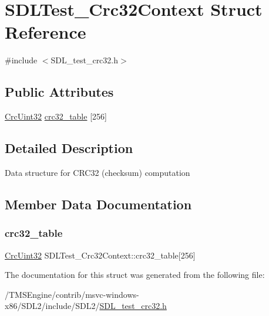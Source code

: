 \hypertarget{struct_s_d_l_test___crc32_context}{}\section{S\+D\+L\+Test\+\_\+\+Crc32\+Context Struct Reference}
\label{struct_s_d_l_test___crc32_context}


{\ttfamily \#include $<$S\+D\+L\+\_\+test\+\_\+crc32.\+h$>$}

\subsection*{Public Attributes}
\begin{DoxyCompactItemize}
\item 
\hyperlink{_s_d_l__test__crc32_8h_ac0e8fe38fa91e9aa4b32957420795387}{Crc\+Uint32} \hyperlink{struct_s_d_l_test___crc32_context_ae95d0d0b48bafc4e2f6f032f754ffa4c}{crc32\+\_\+table} \mbox{[}256\mbox{]}
\end{DoxyCompactItemize}


\subsection{Detailed Description}
Data structure for C\+R\+C32 (checksum) computation 

\subsection{Member Data Documentation}
\mbox{\label{struct_s_d_l_test___crc32_context_ae95d0d0b48bafc4e2f6f032f754ffa4c}} 
\subsubsection{\texorpdfstring{crc32\+\_\+table}{crc32\_table}}
{\footnotesize\ttfamily \hyperlink{_s_d_l__test__crc32_8h_ac0e8fe38fa91e9aa4b32957420795387}{Crc\+Uint32} S\+D\+L\+Test\+\_\+\+Crc32\+Context\+::crc32\+\_\+table\mbox{[}256\mbox{]}}



The documentation for this struct was generated from the following file\+:\begin{DoxyCompactItemize}
\item 
/\+T\+M\+S\+Engine/contrib/msvc-\/windows-\/x86/\+S\+D\+L2/include/\+S\+D\+L2/\hyperlink{_s_d_l__test__crc32_8h}{S\+D\+L\+\_\+test\+\_\+crc32.\+h}\end{DoxyCompactItemize}
